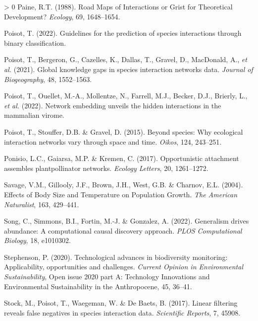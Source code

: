 \documentclass[11pt]{article}
\newlength{\cslhangindent}
\newenvironment{CSLReferences}[3] %
 {%
  \setlength{\parindent}{0pt}
  \ifodd #1 \everypar{\setlength{\hangindent}{\cslhangindent}}\ignorespaces\fi
  \ifnum #2 > 0
  \setlength{\parskip}{#2\baselineskip}
  \fi
 }%
 {}
\begin{document}
\begin{CSLReferences}{1}{0}
\leavevmode\hypertarget{ref-Paine1988RoaMap}{}%
Paine, R.T. (1988). Road Maps of Interactions or Grist for Theoretical
Development? \emph{Ecology}, 69, 1648--1654.

\leavevmode\hypertarget{ref-Poisot2022GuiPre}{}%
Poisot, T. (2022). Guidelines for the prediction of species interactions
through binary classification.

\leavevmode\hypertarget{ref-Poisot2021GloKno}{}%
Poisot, T., Bergeron, G., Cazelles, K., Dallas, T., Gravel, D.,
MacDonald, A., \emph{et al.} (2021). Global knowledge gaps in species
interaction networks data. \emph{Journal of Biogeography}, 48,
1552--1563.

\leavevmode\hypertarget{ref-Poisot2022NetEmb}{}%
Poisot, T., Ouellet, M.-A., Mollentze, N., Farrell, M.J., Becker, D.J.,
Brierly, L., \emph{et al.} (2022). Network embedding unveils the hidden
interactions in the mammalian virome.

\leavevmode\hypertarget{ref-Poisot2015SpeWhy}{}%
Poisot, T., Stouffer, D.B. \& Gravel, D. (2015). Beyond species: Why
ecological interaction networks vary through space and time.
\emph{Oikos}, 124, 243--251.

\leavevmode\hypertarget{ref-Ponisio2017OppAtt}{}%
Ponisio, L.C., Gaiarsa, M.P. \& Kremen, C. (2017). Opportunistic
attachment assembles plantpollinator networks. \emph{Ecology Letters},
20, 1261--1272.

\leavevmode\hypertarget{ref-Savage2004EffBod}{}%
Savage, V.M., Gillooly, J.F., Brown, J.H., West, G.B. \& Charnov, E.L.
(2004). Effects of Body Size and Temperature on Population Growth.
\emph{The American Naturalist}, 163, 429--441.

\leavevmode\hypertarget{ref-Song2022GenDri}{}%
Song, C., Simmons, B.I., Fortin, M.-J. \& Gonzalez, A. (2022).
Generalism drives abundance: A computational causal discovery approach.
\emph{PLOS Computational Biology}, 18, e1010302.

\leavevmode\hypertarget{ref-Stephenson2020TecAdv}{}%
Stephenson, P. (2020). Technological advances in biodiversity
monitoring: Applicability, opportunities and challenges. \emph{Current
Opinion in Environmental Sustainability}, Open issue 2020 part A:
Technology Innovations and Environmental Sustainability in the
Anthropocene, 45, 36--41.

\leavevmode\hypertarget{ref-Stock2017LinFil}{}%
Stock, M., Poisot, T., Waegeman, W. \& De Baets, B. (2017). Linear
filtering reveals false negatives in species interaction data.
\emph{Scientific Reports}, 7, 45908.


\end{CSLReferences}
\end{document}
